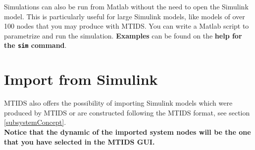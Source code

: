 \documentclass[a4paper,twoside, openright,12pt]{report}
\begin{document}
Simulations can also be run from Matlab without the need to open the Simulink model. This is particularly useful for large Simulink models, like models of over 100 nodes that
you may produce with MTIDS. You can write a Matlab script to parametrize  and run the simulation. \textbf{Examples} can be found on the \textbf{help for the \texttt{sim} command}.
% 
% 
% 
% 
% 
% 
% 
% 
% 

 


\section{Import from Simulink}

MTIDS also offers the possibility of importing Simulink models which were produced by MTIDS or are constructed following the MTIDS format, 
see section \ref{subsystemConcept}.\\

\textbf{Notice that the dynamic of the imported system nodes will be the one that you have selected in the MTIDS GUI.}
\\
\end{document}
